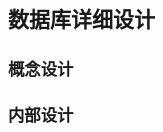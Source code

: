 \documentclass{article}
\begin{document}
\subsection{数据库详细设计}
\begin{comment}
本章应根据需要分条描述数据库的详细设计。设计级别数以及每一级别的名称应基于所用的设计方法学。数据库设计级别的例子包括：概念设计、内部设计、逻辑设计和物理设计。如果这些设计决策的部分或全部依赖于系统状态或方式，则应指出这种依赖性。应给出或引用为理解这些设计所需的设计约定。
注：本文用术语“数据元素集合体”表示在给定的设计级别(如概念设计、内部设计、逻辑设计、物理设计)中具有结构特征(数据元素的编号/次序/分组)的任何实体、关系、模式、字段、表、数组等；同时用术语“数据元素”表示在给定的级别中没有结构特征的关系、属性、字段、配置项、数据元素等。
4.x(数据库设计级别的名称)
本条应标识一个数据库设计级别，并用所选择的设计方法的术语描述数据库的数据元素和数据元素集合体。(若适用)描述信息应包括以下内容，它们可按适合于要提供的信息的任何次序给出。
a.数据库设计中的单个数据元素特性，例如：
1)名称/标识符；
a)项目唯一标识符；
b)非技术(自然语言)名称；
c)标准数据元素名；
d)技术名称(如数据库中的字段名)；
e)缩写名或同义名；
2)数据类型(字母数字、整数等)；
3)大小与格式(例如字符串的长度与标点符号)；
4)计量单位(如米、元、纳秒等)；
5)范围或可能值的枚举(如0-99)；
6)准确度(正确程度)与精度(有效位数)；
7)优先级、时序、频率、容量、序列和其他约束，如数据元素是否可被更新，业务规则是否适用；
8)保密性与私密性约束；
9)来源(设置/发送实体)与接收者(使用/接收实体)。
b.数据库设计中的数据元素集合体(记录、消息、文件、数组、显示、报表等)的特性，例如：
1)名称/标识符；
a)项目唯一标识符；
b)非技术(自然语言)名称；
c)技术名称(如代码或数据库中的记录或数据结构名)；
d)缩写名或同义名；
2)数据元素集合体中的数据元素及其结构(编号、次序、分组)；
3)媒体(如盘)及媒体上数据元素/集合体的结构；
4)显示和其他输出的视听特性(如颜色、布局、字体、图标及其他显示元素、蜂鸣声、亮度等)；
5)数据元素集合体之间的关系，如排序/访问特性；
6)优先级、时序、频率、容量、序列和其他约束，如数据集合体是否可被更新，业务规则是否适用；
7)保密性与私密性约束；
8)来源(设置/发送实体)与接收者(使用/接收实体)。
\end{comment}

\subsubsection{概念设计}

\subsubsection{内部设计}
\end{document}

